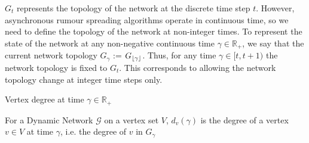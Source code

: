 $G_t$ represents the topology of the network at the discrete time step $t$. However, asynchronous rumour spreading algorithms operate in continuous time, so we need to define the topology of the network at non-integer times. To represent the state of the network at any non-negative continuous time $\gamma \in \mathbb{R}_+$, we say that the current network topology $G_\gamma$ := $G_{\lfloor\gamma\rfloor}$. Thus, for any time $\gamma \in [t, t + 1)$ the network topology is fixed to $G_t$. This corresponds to allowing the network topology change at integer time steps only.


\begin{definition}
	Vertex degree at time $\gamma \in \mathbb{R}_+ $ 

	\noindent
	For a Dynamic Network $\mathcal{G}$ on a vertex set $V$, $d_v(\gamma)$ is the degree of a vertex $v \in V$ at time $\gamma$, i.e. the degree of $v$ in $G_\gamma$
\end{definition}

